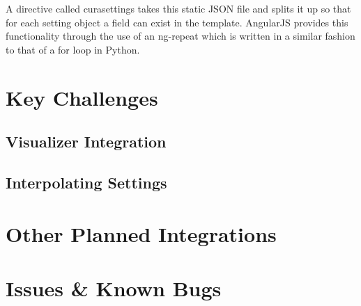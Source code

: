 A directive called curasettings takes this static JSON file and splits it up so that for each setting object a field can exist in the template.
AngularJS provides this functionality through the use of an ng-repeat which is written in a similar fashion to that of a for loop in Python.


\section{Key Challenges}
\subsection{Visualizer Integration}
\paragraph{}
\subsection{Interpolating Settings}
\paragraph{}


\section{Other Planned Integrations}

\section{Issues \& Known Bugs}


